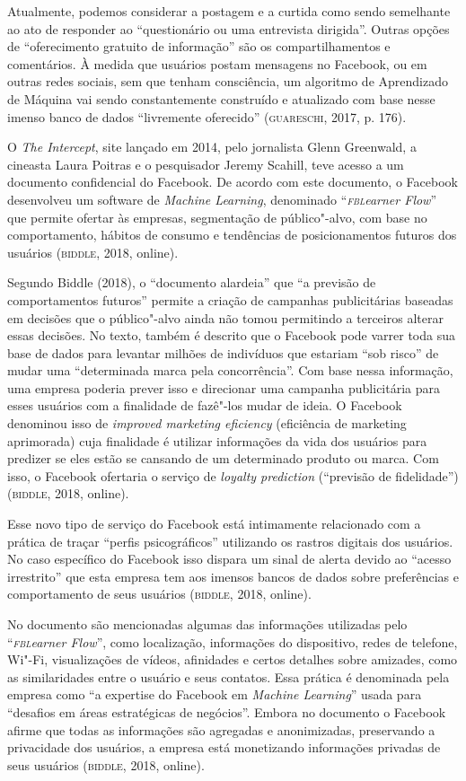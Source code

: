 Atualmente, podemos considerar a postagem e a curtida como sendo
semelhante ao ato de responder ao ``questionário ou uma entrevista
dirigida''. Outras opções de ``oferecimento gratuito de informação'' são
os compartilhamentos e comentários. À medida que usuários postam
mensagens no Facebook, ou em outras redes sociais, sem que tenham
consciência, um algoritmo de Aprendizado de Máquina vai sendo
constantemente construído e atualizado com base nesse imenso banco de
dados ``livremente oferecido'' (\textsc{guareschi}, 2017, p. 176).

O \emph{The Intercept}, site lançado em 2014, pelo jornalista Glenn
Greenwald, a cineasta Laura Poitras e o pesquisador Jeremy Scahill, teve
acesso a um documento confidencial do Facebook. De acordo com este
documento, o Facebook desenvolveu um software de \emph{Machine
Learning}, denominado ``\emph{\textsc{fbl}earner Flow}'' que permite ofertar às
empresas, segmentação de público"-alvo, com base no comportamento,
hábitos de consumo e tendências de posicionamentos futuros dos usuários
(\textsc{biddle}, 2018, online).

Segundo Biddle (2018), o ``documento alardeia'' que ``a previsão de
comportamentos futuros'' permite a criação de campanhas publicitárias
baseadas em decisões que o público"-alvo ainda não tomou permitindo a
terceiros alterar essas decisões. No texto, também é descrito que o
Facebook pode varrer toda sua base de dados para levantar milhões de
indivíduos que estariam ``sob risco'' de mudar uma ``determinada marca
pela concorrência''. Com base nessa informação, uma empresa poderia
prever isso e direcionar uma campanha publicitária para esses usuários
com a finalidade de fazê"-los mudar de ideia.
O Facebook denominou isso de \emph{improved marketing eficiency} (eficiência de marketing
aprimorada) cuja finalidade é utilizar informações da vida dos usuários
para predizer se eles estão se cansando de um determinado produto ou
marca. Com isso, o Facebook ofertaria o serviço de \emph{loyalty
prediction} (``previsão de fidelidade'') (\textsc{biddle}, 2018, online).

Esse novo tipo de serviço do Facebook está intimamente relacionado com a
prática de traçar ``perfis psicográficos'' utilizando os rastros
digitais dos usuários. No caso específico do Facebook isso dispara um
sinal de alerta devido ao ``acesso irrestrito'' que esta empresa tem aos
imensos bancos de dados sobre preferências e comportamento de seus
usuários (\textsc{biddle}, 2018, online).

No documento são mencionadas algumas das informações utilizadas pelo
``\emph{\textsc{fbl}earner Flow}'', como localização, informações do dispositivo,
redes de telefone, Wi"-Fi, visualizações de vídeos, afinidades e certos
detalhes sobre amizades, como as similaridades entre o usuário e seus
contatos. Essa prática é denominada pela empresa como ``a expertise do
Facebook em \emph{Machine Learning}'' usada para ``desafios em áreas
estratégicas de negócios''. Embora no documento o Facebook afirme que
todas as informações são agregadas e anonimizadas, preservando a
privacidade dos usuários, a empresa está monetizando informações
privadas de seus usuários (\textsc{biddle}, 2018, online).

